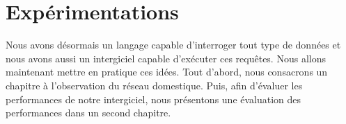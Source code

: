 \part{Expérimentations}
Nous avons désormais un langage capable d'interroger tout type de données et nous avons aussi un intergiciel capable d'exécuter ces requêtes. Nous allons maintenant mettre en pratique ces idées. Tout d'abord, nous consacrons un chapitre à l'observation du réseau domestique. Puis, afin d'évaluer les performances de notre intergiciel, nous présentons une évaluation des performances dans un second chapitre.



